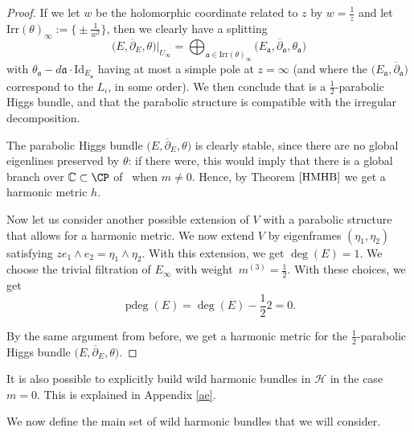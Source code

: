 \begin{proof}
If we let $w$ be the holomorphic coordinate related to $z$ by $w=\frac{1}{z}$ and let $\text{Irr}(\theta)_{\infty}:=\bigl\{\pm \frac{1}{w^2}\bigr\}$, then we clearly have a splitting
\begin{equation*}
 \bigl(E,\overline{\partial}_E,\theta\bigr)|_{U_{\infty}}=\bigoplus_{\mathfrak{a}\in \text{Irr}(\theta)_{\infty}} \bigl(E_{\mathfrak{a}},\overline{\partial}_{\mathfrak{a}},\theta_{\mathfrak{a}}\bigr)
\end{equation*}
with $\theta_{\mathfrak{a}}-d\mathfrak{a}\cdot \text{Id}_{E_{\mathfrak{a}}}$ having at most a simple pole at $z=\infty$ (and where the $\bigl(E_{\mathfrak{a}},\overline{\partial}_{\mathfrak{a}}\bigr)$ correspond to the $L_i$, in some order). We then conclude that  is a $\frac{1}{2}$-parabolic Higgs bundle, and that the parabolic structure is compatible with the irregular decomposition.

The parabolic Higgs bundle $\bigl(E,\overline{\partial}_E,\theta\bigr)$ is clearly stable, since there are no global eigenlines preserved by $\theta$: if there were, this would imply that there is a global branch over $\mathbb{C}\subset \CP$ of~ when $m\neq 0$. Hence, by Theorem $\ref{HMHB}$ we get a harmonic metric $h$.

Now let us consider another possible extension of $V$ with a parabolic structure that allows for a harmonic metric. We now extend $V$ by eigenframes $(\eta_1,\eta_2)$ satisfying $ze_1\wedge e_2=\eta_1\wedge \eta_2$. With this extension, we get $\deg(E)=1$. We choose the trivial filtration of $E_{\infty}$ with weight~$m^{(3)}=\frac{1}{2}$. With these choices, we get
\begin{equation*}
 \operatorname{pdeg}(E)=\operatorname{deg}(E)-\frac{1}{2}2=0.
\end{equation*}

By the same argument from before, we get a harmonic metric for the $\frac{1}{2}$-parabolic Higgs bundle $\bigl(E,\overline{\partial}_E,\theta\bigr)$.
\end{proof}

It is also possible to explicitly build wild harmonic bundles in $\mathcal{H}$ in the case $m=0$. This is explained in Appendix \ref{ae}.

We now define the main set of wild harmonic bundles that we will consider.


